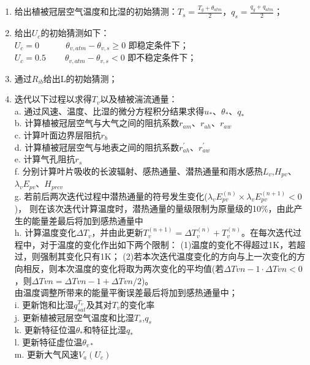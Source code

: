 \begin{enumerate}
    \item 给出植被冠层空气温度和比湿的初始猜测：$T_s=\frac{T_g+\theta_{atm}}{2}$，$q_s=\frac{q_g+q_{atm}}{2}$；
    \item 给出$U_c$的初始猜测如下：\\
    $U_c=0\ \ \ \ \ \ \ \ \ \ \ \ \ \ \theta_{v,atm}-\theta_{v,s}\geq0$ 即稳定条件下；\\
    $U_c=0.5\ \ \ \ \ \ \ \ \ \ \theta_{v,atm}-\theta_{v,s}<0$ 即不稳定条件下；
    \item 通过$R_{ib}$给出L的初始猜测；
    \item 迭代以下过程以求得$T_v$以及植被湍流通量：\\
    a. 通过风速、温度、比湿的微分方程积分结果求得$u_\ast$、$\theta_\ast$、$q_\ast$ \\
    b. 计算植被冠层空气与大气之间的阻抗系数$r_{am}$、$r_{ah}$、$r_{aw}$ \\
    c. 计算叶面边界层阻抗$r_b$ \\
    d. 计算植被冠层空气与地表之间的阻抗系数$r_{ah}^\prime$、$r_{aw}^\prime$ \\
    e. 计算气孔阻抗$r_s$ \\
    f. 分别计算叶片吸收的长波辐射、感热通量、潜热通量和雨水感热$L_v$,$H_{pv}$、$\lambda_vE_{pv}$、$H_{prcv}$ \\
    g. 若前后两次迭代过程中潜热通量的符号发生变化($\lambda_vE_{pv}^{\left(n\right)}\times\lambda_vE_{pv}^{\left(n+1\right)}<0$)，
    则在该次迭代计算温度时，潜热通量的量级限制为原量级的10\%，由此产生的能量差最后将加到感热通量中 \\
    h. 计算温度变化$\Delta T_v$，并由此更新$T_v^{\left(n+1\right)}=\Delta T_v^{\left(n\right)}+T_v^{\left(n\right)}$。在每次迭代过程中，对于温度的变化作出如下两个限制：
    (1)温度的变化不得超过1K，若超过，则强制其变化只有1K；
    (2)若本次迭代温度变化的方向与上一次变化的方向相反，则本次温度的变化将取为两次变化的平均值(若$\Delta Tvn-1 \cdot \Delta Tvn<0$，则$\Delta Tvn=\Delta Tvn-1+\Delta Tvn/2$)。\\
    由温度调整所带来的能量平衡误差最后将加到感热通量中；\\
    i. 更新饱和比湿$q_{sat}^{T_v}$及其对$T_v$的变化率 \\
    j. 更新植被冠层空气温度和比湿$T_s$,$q_s$ \\ 
    k. 更新特征位温$\theta_\ast$和特征比湿$q_\ast$ \\
    l. 更新特征虚位温$\theta_{v\ast}$ \\
    m. 更新大气风速$V_a\left(U_c\right)$ \\

\end{enumerate}
